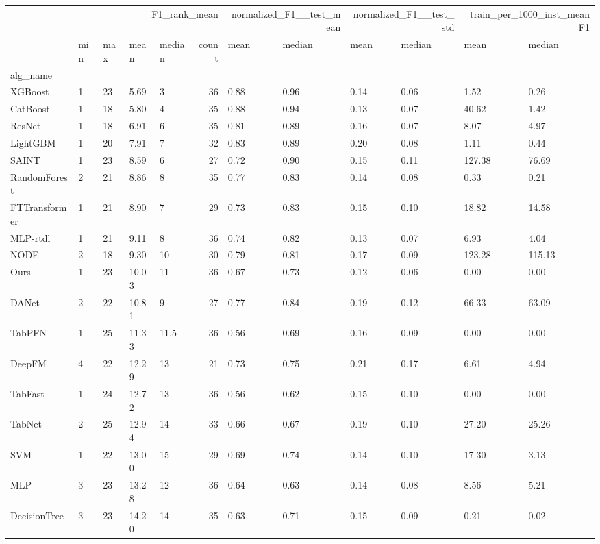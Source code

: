 \begin{tabular}{lllllrllllll}
\toprule
 & \multicolumn{5}{r}{F1_rank_mean} & \multicolumn{2}{r}{normalized_F1__test_mean} & \multicolumn{2}{r}{normalized_F1__test_std} & \multicolumn{2}{r}{train_per_1000_inst_mean_F1} \\
 & min & max & mean & median & count & mean & median & mean & median & mean & median \\
alg_name &  &  &  &  &  &  &  &  &  &  &  \\
\midrule
XGBoost & 1 & 23 & 5.69 & 3 & 36 & 0.88 & 0.96 & 0.14 & 0.06 & 1.52 & 0.26 \\
CatBoost & 1 & 18 & 5.80 & 4 & 35 & 0.88 & 0.94 & 0.13 & 0.07 & 40.62 & 1.42 \\
ResNet & 1 & 18 & 6.91 & 6 & 35 & 0.81 & 0.89 & 0.16 & 0.07 & 8.07 & 4.97 \\
LightGBM & 1 & 20 & 7.91 & 7 & 32 & 0.83 & 0.89 & 0.20 & 0.08 & 1.11 & 0.44 \\
SAINT & 1 & 23 & 8.59 & 6 & 27 & 0.72 & 0.90 & 0.15 & 0.11 & 127.38 & 76.69 \\
RandomForest & 2 & 21 & 8.86 & 8 & 35 & 0.77 & 0.83 & 0.14 & 0.08 & 0.33 & 0.21 \\
FTTransformer & 1 & 21 & 8.90 & 7 & 29 & 0.73 & 0.83 & 0.15 & 0.10 & 18.82 & 14.58 \\
MLP-rtdl & 1 & 21 & 9.11 & 8 & 36 & 0.74 & 0.82 & 0.13 & 0.07 & 6.93 & 4.04 \\
NODE & 2 & 18 & 9.30 & 10 & 30 & 0.79 & 0.81 & 0.17 & 0.09 & 123.28 & 115.13 \\
Ours & 1 & 23 & 10.03 & 11 & 36 & 0.67 & 0.73 & 0.12 & 0.06 & 0.00 & 0.00 \\
DANet & 2 & 22 & 10.81 & 9 & 27 & 0.77 & 0.84 & 0.19 & 0.12 & 66.33 & 63.09 \\
TabPFN & 1 & 25 & 11.33 & 11.5 & 36 & 0.56 & 0.69 & 0.16 & 0.09 & 0.00 & 0.00 \\
DeepFM & 4 & 22 & 12.29 & 13 & 21 & 0.73 & 0.75 & 0.21 & 0.17 & 6.61 & 4.94 \\
TabFast & 1 & 24 & 12.72 & 13 & 36 & 0.56 & 0.62 & 0.15 & 0.10 & 0.00 & 0.00 \\
TabNet & 2 & 25 & 12.94 & 14 & 33 & 0.66 & 0.67 & 0.19 & 0.10 & 27.20 & 25.26 \\
SVM & 1 & 22 & 13.00 & 15 & 29 & 0.69 & 0.74 & 0.14 & 0.10 & 17.30 & 3.13 \\
MLP & 3 & 23 & 13.28 & 12 & 36 & 0.64 & 0.63 & 0.14 & 0.08 & 8.56 & 5.21 \\
DecisionTree & 3 & 23 & 14.20 & 14 & 35 & 0.63 & 0.71 & 0.15 & 0.09 & 0.21 & 0.02 \\

\end{tabular}
